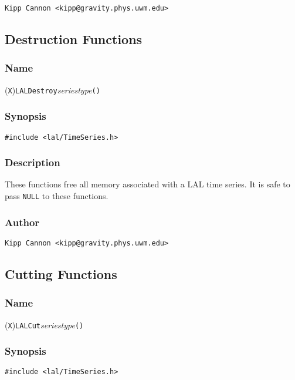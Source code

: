 \verb|Kipp Cannon <kipp@gravity.phys.uwm.edu>|


\subsection{Destruction Functions}

\subsubsection{Name}

(\texttt{X})\texttt{LALDestroy}\textit{seriestype}\texttt{()}

\subsubsection{Synopsis}

\begin{verbatim}
#include <lal/TimeSeries.h>
\end{verbatim}


\subsubsection{Description}

These functions free all memory associated with a LAL time series.  It is
safe to pass \texttt{NULL} to these functions.

\subsubsection{Author}

\verb|Kipp Cannon <kipp@gravity.phys.uwm.edu>|


\subsection{Cutting Functions}

\subsubsection{Name}

(\texttt{X})\texttt{LALCut}\textit{seriestype}\texttt{()}

\subsubsection{Synopsis}

\begin{verbatim}
#include <lal/TimeSeries.h>
\end{verbatim}


